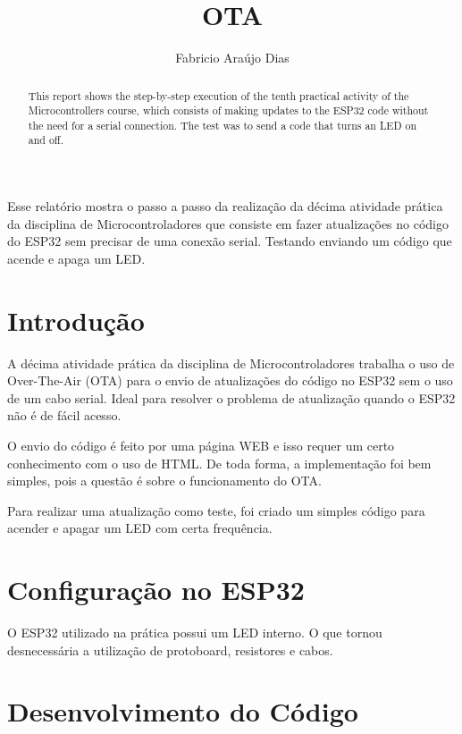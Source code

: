 \documentclass[12pt]{article}
\title{OTA}
\author{Fabricio Araújo Dias}
\begin{document}
 

\maketitle

\begin{abstract}
    This report shows the step-by-step execution of the tenth practical activity of the Microcontrollers course, which consists of making updates to the ESP32 code without the need for a serial connection. The test was to send a code that turns an LED on and off.
\end{abstract}
     
\begin{resumo}
    Esse relatório mostra o passo a passo da realização da décima atividade prática da disciplina de Microcontroladores que consiste em fazer atualizações no código do ESP32 sem precisar de uma conexão serial. Testando enviando um código que acende e apaga um LED.
\end{resumo}

\section{Introdução}

A décima atividade prática da disciplina de Microcontroladores trabalha o uso de Over-The-Air (OTA) para o envio de atualizações do código no ESP32 sem o uso de um cabo serial. Ideal para resolver o problema de atualização quando o ESP32 não é de fácil acesso.

O envio do código é feito por uma página WEB e isso requer um certo conhecimento com o uso de HTML. De toda forma, a implementação foi bem simples, pois a questão é sobre o funcionamento do OTA.

Para realizar uma atualização como teste, foi criado um simples código para acender e apagar um LED com certa frequência.


\section{Configuração no ESP32}

O ESP32 utilizado na prática possui um LED interno. O que tornou desnecessária a utilização de protoboard, resistores e cabos.

\section{Desenvolvimento do Código}
\end{document}
